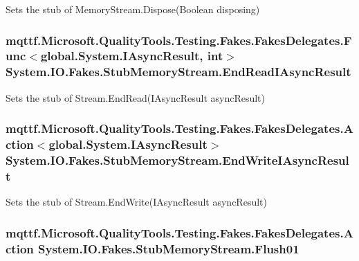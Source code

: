 Sets the stub of Memory\-Stream.\-Dispose(\-Boolean disposing)

\hypertarget{class_system_1_1_i_o_1_1_fakes_1_1_stub_memory_stream_a2f52741a1fc8955b0de2eaf198d599b2}{
\subsubsection[{End\-Read\-I\-Async\-Result}]{\setlength{\rightskip}{0pt plus 5cm}mqttf.\-Microsoft.\-Quality\-Tools.\-Testing.\-Fakes.\-Fakes\-Delegates.\-Func$<$global.\-System.\-I\-Async\-Result, int$>$ System.\-I\-O.\-Fakes.\-Stub\-Memory\-Stream.\-End\-Read\-I\-Async\-Result}}\label{class_system_1_1_i_o_1_1_fakes_1_1_stub_memory_stream_a2f52741a1fc8955b0de2eaf198d599b2}


Sets the stub of Stream.\-End\-Read(\-I\-Async\-Result async\-Result)

\hypertarget{class_system_1_1_i_o_1_1_fakes_1_1_stub_memory_stream_a6275f0b6bdadccd4d37eb73711e09fb7}{
\subsubsection[{End\-Write\-I\-Async\-Result}]{\setlength{\rightskip}{0pt plus 5cm}mqttf.\-Microsoft.\-Quality\-Tools.\-Testing.\-Fakes.\-Fakes\-Delegates.\-Action$<$global.\-System.\-I\-Async\-Result$>$ System.\-I\-O.\-Fakes.\-Stub\-Memory\-Stream.\-End\-Write\-I\-Async\-Result}}\label{class_system_1_1_i_o_1_1_fakes_1_1_stub_memory_stream_a6275f0b6bdadccd4d37eb73711e09fb7}


Sets the stub of Stream.\-End\-Write(\-I\-Async\-Result async\-Result)

\hypertarget{class_system_1_1_i_o_1_1_fakes_1_1_stub_memory_stream_a2102c8d4d71a15e87ffc96d56e6382a0}{
\subsubsection[{Flush01}]{\setlength{\rightskip}{0pt plus 5cm}mqttf.\-Microsoft.\-Quality\-Tools.\-Testing.\-Fakes.\-Fakes\-Delegates.\-Action System.\-I\-O.\-Fakes.\-Stub\-Memory\-Stream.\-Flush01}}\label{class_system_1_1_i_o_1_1_fakes_1_1_stub_memory_stream_a2102c8d4d71a15e87ffc96d56e6382a0}


